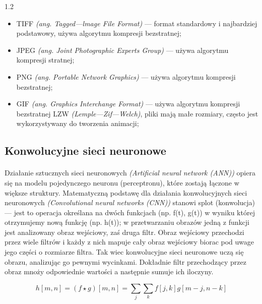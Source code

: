 \documentclass[a4paper,12pt]{article}
\newcommand\spacingInSolemnItemize{1.2}
\begin{document}
				\begin{spacing}{\spacingInSolemnItemize}
					\begin{itemize}
						\item TIFF \textit{(ang. Tagged---lmage File Format)} --- format standardowy i najbardziej podstawowy, używa algorytmu kompresji bezstratnej;
						\item JPEG \textit{(ang. Joint Photographic Experts Group)} --- używa algorytmu kompresji stratnej;
						\item PNG \textit{(ang. Portable Network Graphics)} --- używa algorytmu kompresji bezstratnej; 
						\item GIF \textit{(ang. Graphics Interchange Format)} --- używa algorytmu kompresji bezstratnej LZW \textit{(Lemple---Zif---Welch)}, 
							pliki mają małe rozmiary, często jest wykorzystywany do tworzenia animacji;
					\end{itemize}
				\end{spacing}
    
    \subsection{Konwolucyjne sieci neuronowe}
        \paragraph{\indent} Działanie sztucznych sieci neuronowych \textit{(Artificial neural network (ANN))} opiera się na modelu pojedynczego     
			neuronu (perceptronu), które zostają łączone w większe struktury. Matematyczną podstawę dla działania konwolucyjnych sieci neuronowych 
			\textit{(Convolutional neural networks (CNN))} stanowi splot (konwolucja) --- jest to operacja określana na dwóch funkcjach (np. f(t), g(t)) 
			w wyniku której otrzymujemy nową funkcję (np. h(t)); w przetwarzaniu obrazów jedną z funkcji jest analizowany obraz wejściowy, zaś druga filtr.
            Obraz wejściowy przechodzi przez wiele filtrów i każdy z nich mapuje cały obraz wejściowy biorac pod uwage jego części o rozmiarze filtra. 
			Tak wiec konwolucyjne sieci neuronowe uczą się obrazu, analizując go pewnymi wycinkami. Dokładnie filtr przechodzący przez obraz 
			mnoży odpowiednie wartości a następnie sumuje ich iloczyny.
        
            \begin{displaymath}
                h[m, n] = ( f \star g)[m, n] = \sum\limits_{j}\sum\limits_{k}f[j, k]g[m-j, n-k]
            \end{displaymath}
		    \newpage
		    
\end{document}

